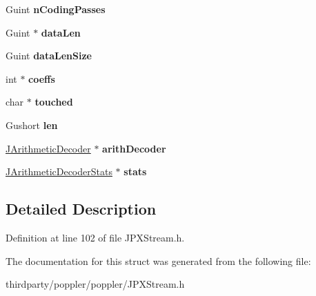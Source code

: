 \begin{DoxyCompactItemize}
Guint {\bfseries n\+Coding\+Passes}
\item 
\mbox{\label{struct_j_p_x_code_block_af1ebce74307243bee3608546e5e0fdfb}} 
Guint $\ast$ {\bfseries data\+Len}
\item 
\mbox{\label{struct_j_p_x_code_block_af8aaf69f108aad26d8194cc09a17bd6c}} 
Guint {\bfseries data\+Len\+Size}
\item 
\mbox{\label{struct_j_p_x_code_block_af7188c295233a2ea10f0cb1bdc6c9edf}} 
int $\ast$ {\bfseries coeffs}
\item 
\mbox{\label{struct_j_p_x_code_block_a40f17b7e6b49505b38b126cdfe9f27d0}} 
char $\ast$ {\bfseries touched}
\item 
\mbox{\label{struct_j_p_x_code_block_afcb37b26a19b324e1894dcc835bfae74}} 
Gushort {\bfseries len}
\item 
\mbox{\label{struct_j_p_x_code_block_aef95ef62c4554476c1871b94a7df0a57}} 
\hyperlink{class_j_arithmetic_decoder}{J\+Arithmetic\+Decoder} $\ast$ {\bfseries arith\+Decoder}
\item 
\mbox{\label{struct_j_p_x_code_block_a8a2ce7f0b48326ac25286ffb3c06c6a8}} 
\hyperlink{class_j_arithmetic_decoder_stats}{J\+Arithmetic\+Decoder\+Stats} $\ast$ {\bfseries stats}
\end{DoxyCompactItemize}


\subsection{Detailed Description}


Definition at line 102 of file J\+P\+X\+Stream.\+h.



The documentation for this struct was generated from the following file\+:\begin{DoxyCompactItemize}
\item 
thirdparty/poppler/poppler/J\+P\+X\+Stream.\+h\end{DoxyCompactItemize}
